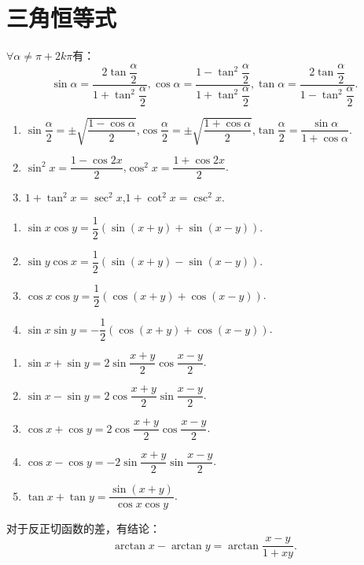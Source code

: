\section{三角恒等式}

\begin{proposition}[三角函数万能公式]
	$\forall \alpha \neq \pi+2k\pi$有：
	\begin{equation}
		\sin{\alpha} = \dfrac{2\tan{\dfrac{\alpha}{2}}}{1+\tan^2\dfrac{\alpha}{2}},\cos{\alpha} = \dfrac{1-\tan^2\dfrac{\alpha}{2}}{1+\tan^2\dfrac{\alpha}{2}},\tan{\alpha} = \dfrac{2\tan{\dfrac{\alpha}{2}}}{1-\tan^2\dfrac{\alpha}{2}}.
	\end{equation}
\end{proposition}


\begin{proposition}[半角公式与倍角公式]
	\begin{enumerate}
		\item $\sin{\dfrac{\alpha}{2}} = \pm\sqrt{\dfrac{1-\cos{\alpha}}{2}}$,$\cos{\dfrac{\alpha}{2}} = \pm\sqrt{\dfrac{1+\cos{\alpha}}{2}}$,$\tan{\dfrac{\alpha}{2}} = \dfrac{\sin{\alpha}}{1+\cos{\alpha}}$.
		\item $\sin^2{x}=\dfrac{1-\cos{2x}}{2}$,$\cos^2{x}=\dfrac{1+\cos{2x}}{2}$.
		\item $1+\tan^2{x} = \sec^2{x}$,$1+\cot^2{x}=\csc^2{x}$.
	\end{enumerate}
\end{proposition}


\begin{theorem}[积化和差]
	\begin{enumerate}
		\item $\sin{x}\cos{y} = \dfrac{1}{2}\left(\sin{(x+y)}+\sin{(x-y)}\right)$.
		\item $\sin{y}\cos{x} = \dfrac{1}{2}\left(\sin{(x+y)}-\sin{(x-y)}\right)$.
		\item $\cos{x}\cos{y} = \dfrac{1}{2}\left(\cos{(x+y)}+\cos{(x-y)}\right)$.
		\item $\sin{x}\sin{y} = -\dfrac{1}{2}\left(\cos{(x+y)}+\cos{(x-y)}\right)$.
	\end{enumerate}
\end{theorem}

\begin{theorem}[和差化积]
	\begin{enumerate}
		\item $\sin{x}+\sin{y} = 2\sin{\dfrac{x+y}{2}}\cos{\dfrac{x-y}{2}}$.
		\item $\sin{x}-\sin{y} = 2\cos{\dfrac{x+y}{2}}\sin{\dfrac{x-y}{2}}$.
		\item $\cos{x}+\cos{y} = 2\cos{\dfrac{x+y}{2}}\cos{\dfrac{x-y}{2}}$.
		\item $\cos{x}-\cos{y} = -2\sin{\dfrac{x+y}{2}}\sin{\dfrac{x-y}{2}}$.
		\item $\tan{x}+\tan{y} = \dfrac{\sin{(x+y)}}{\cos{x}\cos{y}}$.
	\end{enumerate}
\end{theorem}

\begin{proposition}
	对于反正切函数的差，有结论：
	\begin{equation}
		\arctan{x} - \arctan{y} = \arctan{\dfrac{x-y}{1+xy}}.
	\end{equation}
\end{proposition}